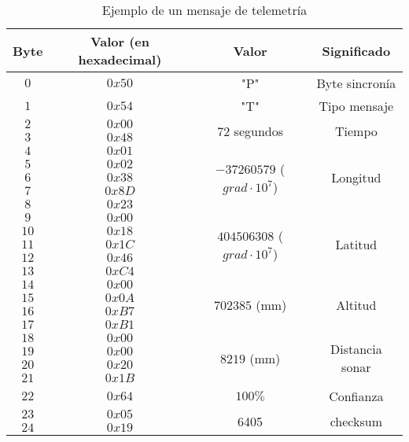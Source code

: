\begin{table}
	\centering
	\caption{Ejemplo de un mensaje de telemetría}
	\begin{tabular}{|c|c|c|c|}\hline
		\textbf{Byte} 	&	\textbf{Valor (en hexadecimal)}	&\textbf{Valor}	&\textbf{Significado} \\ \hline \hline
		$0$ 			&  $0x50$			& "P"	& Byte sincronía	\\ \hline
		$1$				&  $0x54$			& "T"	& Tipo mensaje		\\ \hline
		$2$				&  $0x00$			& \multirow{2}{*}{$72$ segundos} & \multirow{2}{*}{Tiempo} \\
		$3$				&  $0x48$			&  & \\ \hline	
		$4$				&  $0x01$			&  \multirow{5}{*}{$-37260579$ ($grad \cdot 10^{7}$) } &  \multirow{5}{*}{Longitud}  \\
		$5$				&  $0x02$			&  &   \\ 	
		$6$				&  $0x38$			&  &    \\ 	
		$7$				&  $0x8D$			&  &    \\ 	
		$8$				&  $0x23$			&   &   \\ \hline
		$9$				&  $0x00$			& \multirow{5}{*}{$404506308$ ($grad \cdot 10^{7}$) } &  \multirow{5}{*}{Latitud}   \\
		$10$				&  $0x18$			&  &     \\ 	
		$11$				&  $0x1C$			&  &      \\ 	
		$12$				&  $0x46$			&  &      \\ 	
		$13$				&  $0xC4$			&  &      \\ \hline
		$14$				&  $0x00$			& \multirow{4}{*}{$702385$ (mm) } & \multirow{4}{*}{Altitud}\\
		$15$				&  $0x0A$			&   &     \\ 	
		$16$				&  $0xB7$			&   &         \\ 	
		$17$				&  $0xB1$			&   &        \\ \hline
		$18$				&  $0x00$			& \multirow{4}{*}{$8219$ (mm) } & \multirow{4}{*}{Distancia sonar}\\
		$19$				&  $0x00$			&     &     \\ 	
		$20$				&  $0x20$			&     &     \\ 	
		$21$				&  $0x1B$			&     &     \\ 	\hline
		$22$				&  $0x64$			& $100 \%$ &     Confianza \\ \hline
		$23$				&  $0x05$			&  \multirow{2}{*}{6405}	& \multirow{2}{*}{checksum} \\
		$24$				&  $0x19$			&     &     \\ \hline	
		
		
	\end{tabular}
	\label{tab:3}
\end{table}

